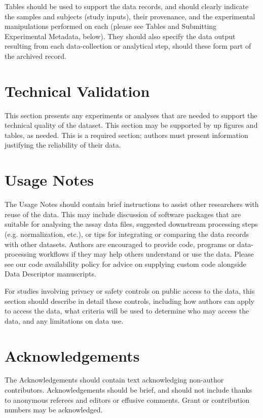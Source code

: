 \documentclass[a4paper,10pt,english]{article}
\begin{document}
Tables should be used to support the data records, and should clearly indicate the samples and subjects (study inputs), their provenance, and the experimental manipulations performed on each (please see Tables and Submitting Experimental Metadata, below). They should also specify the data output resulting from each data-collection or analytical step, should these form part of the archived record.



\section*{Technical Validation}

This section presents any experiments or analyses that are needed
to support the technical quality of the dataset. This section may
be supported by up figures and tables, as needed. This is a required
section; authors must present information justifying the reliability
of their data.


\section*{Usage Notes}

The Usage Notes should contain brief instructions to assist other researchers with reuse of the data. This may include discussion of software packages that are suitable for analysing the assay data files, suggested downstream processing steps (e.g. normalization, etc.), or tips for integrating or comparing the data records with other datasets. Authors are encouraged to provide code, programs or data-processing workflows if they may help others understand or use the data. Please see our code availability policy for advice on supplying custom code alongside Data Descriptor manuscripts.

For studies involving privacy or safety controls on public access to the data, this section should describe in detail these controls, including how authors can apply to access the data, what criteria will be used to determine who may access the data, and any limitations on data use. 



\section*{Acknowledgements}

The Acknowledgements should contain text acknowledging non-author contributors. Acknowledgements should be brief, and should not include thanks to anonymous referees and editors or effusive comments. Grant or contribution numbers may be acknowledged.
\end{document}
